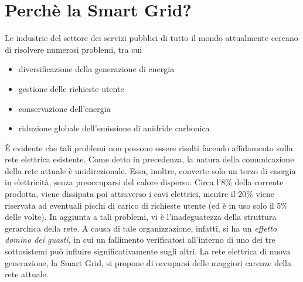 \section{Perchè la Smart Grid?}
Le industrie del settore dei servizi pubblici di tutto il mondo attualmente cercano di risolvere numerosi problemi, tra cui 
\begin{itemize}
\item diversificazione della generazione di energia
\item gestione delle richieste utente
\item conservazione dell'energia
\item riduzione globale dell'emissione di anidride carbonica
\end{itemize}
È evidente che tali problemi non possono essere risolti facendo affidamento sulla rete elettrica esistente. \newline
Come detto in precedenza, la natura della comunicazione della rete attuale è unidirezionale. Essa, inoltre, converte solo un terzo di energia in elettricità, senza preoccuparsi del calore disperso. Circa l'8\% della corrente prodotta, viene dissipata poi attraverso i cavi elettrici, mentre il 20\% viene riservata ad eventuali picchi di carico di richieste utente (ed è in uso solo il 5\% delle volte). \newline
In aggiunta a tali problemi, vi è l'inadeguatezza della struttura gerarchica della rete. A causa di tale organizzazione, infatti, si ha un \textit{effetto domino dei guasti}, in cui un fallimento verificatosi all'interno di uno dei tre sottosistemi può influire significativamente sugli altri. \newline
La rete elettrica di nuova generazione, la Smart Grid, si propone di occuparsi delle maggiori carenze della rete attuale.
\begin{figure}[h]
\end{figure}

